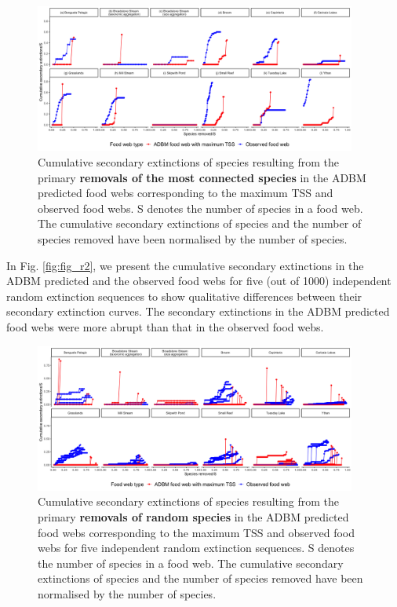 \documentclass{article}
\begin{document}
\begin{figure}

{\centering \includegraphics[width=400px]{../results/plot_mostconnected_maxTSS} 

}

\caption{\label{fig:fig_r1} Cumulative secondary extinctions of species resulting from the primary \textbf{removals of the most connected species} in the ADBM predicted food webs corresponding to the maximum TSS and observed food webs. S denotes the number of species in a food web. The cumulative secondary extinctions of species and the number of species removed have been normalised by the number of species.}\label{fig:unnamed-chunk-2}
\end{figure}

In Fig. \ref{fig:fig_r2}, we present the cumulative secondary
extinctions in the ADBM predicted and the observed food webs for five
(out of 1000) independent random extinction sequences to show
qualitative differences between their secondary extinction curves. The
secondary extinctions in the ADBM predicted food webs were more abrupt
than that in the observed food webs.

\begin{figure}

{\centering \includegraphics[width=400px]{../results/plot_ra_extlines_maxTSS} 

}

\caption{\label{fig:fig_r2} Cumulative secondary extinctions of species resulting from the primary \textbf{removals of random species} in the ADBM predicted food webs corresponding to the maximum TSS and observed food webs for five independent random extinction sequences. S denotes the number of species in a food web. The cumulative secondary extinctions of species and the number of species removed have been normalised by the number of species.}\label{fig:unnamed-chunk-3}
\end{figure}
\end{document}
